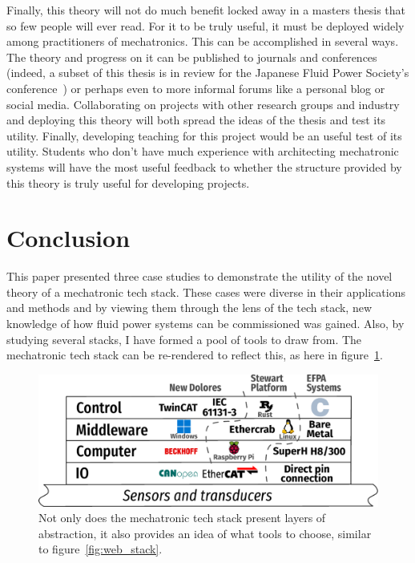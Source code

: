 \documentclass[english,12pt,a4paper,pdftex,eng,utf8]{aaltothesis}
\begin{document}
Finally, this theory will not do much benefit locked away in a masters thesis that so few people will ever read.  For it to be truly useful, it must be deployed widely among practitioners of mechatronics.  This can be accomplished in several ways.  The theory and progress on it can be published to journals and conferences (indeed, a subset of this thesis is in review for the Japanese Fluid Power Society's conference~\cite{Porter2024}) or perhaps even to more informal forums like a personal blog or social media.  Collaborating on projects with other research groups and industry and deploying this theory will both spread the ideas of the thesis and test its utility.  Finally, developing teaching for this project would be an useful test of its utility.  Students who don't have much experience with architecting mechatronic systems will have the most useful feedback to whether the structure provided by this theory is truly useful for developing projects.

\clearpage


\section{Conclusion}

This paper presented three case studies to demonstrate the utility of the novel theory of a mechatronic tech stack. These cases were diverse in their applications and methods and by viewing them through the lens of the tech stack, new knowledge of how fluid power systems can be commissioned was gained. Also, by studying several stacks, I have formed a pool of tools to draw from. The mechatronic tech stack can be re-rendered to reflect this, as here in figure~\ref{fig:mechatronic_tech_stack_filled}.

\begin{figure}[h]
  \centering
  \includegraphics[width=\textwidth]{assets/mechatronic_tech_stack_filled}
  \caption{Not only does the mechatronic tech stack present layers of abstraction, it also provides an idea of what tools to choose, similar to figure~\ref{fig:web_stack}.}\label{fig:mechatronic_tech_stack_filled}
\end{figure}
\end{document}
